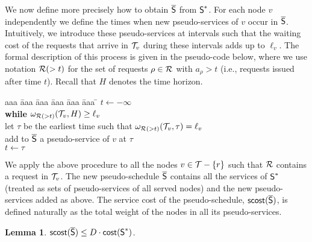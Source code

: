 \documentclass[a4paper]{article}
\newtheorem{lemma}[theorem]{Lemma}
\newcommand{\calR}{{\cal R}}
\newcommand{\calT}{{\cal T}}
\newcommand{\cost}{\mbox{\rm\textsf{cost}}}
\newcommand{\scost}{\mbox{\rm\textsf{scost}}}
\newcommand{\length}{\ell}
\newcommand{\optschedS}{\mbox{\rm\textsf{S}}^\ast}
\newcommand{\pseudoschedS}{\overline{\mbox{\rm\textsf{S}}}}
\begin{document}
We now define more precisely how to obtain $\pseudoschedS$ from $\optschedS$.
For each node $v$ independently we define the times when new
pseudo-services of $v$ occur in $\pseudoschedS$. Intuitively, we introduce
these pseudo-services at intervals such that the waiting cost
of the requests that arrive in $\calT_v$ during these intervals adds
up to $\length_v$.  The formal description of this process is given in
the pseudo-code below, where we use notation $\calR(>t)$ for the set of
requests $\rho\in\calR$ with $a_\rho>t$ (i.e., requests issued after
time $t$). Recall that $H$ denotes the time horizon.

\begin{tabbing}
aaa \= aaa \= aaa \= aaa \= aaa \= aaa \= \kill
\>
$t\gets -\infty$
\\
\> \textbf{while} $\omega_{\calR(>t)}(\calT_v,H)\ge\length_v$
\\
\> \>
let $\tau$ be the earliest time such that
$\omega_{\calR(>t)}(\calT_v,\tau)=\length_v$
\\
\> \>
add to $\pseudoschedS$ a pseudo-service of $v$ at $\tau$ 
\\
\> \>
$t\gets \tau$ 
\end{tabbing}

We apply the above procedure to all the nodes $v\in\calT-\{r\}$
such that $\calR$ contains a request in $\calT_v$. The new
pseudo-schedule $\pseudoschedS$ contains all the services of
$\optschedS$ (treated as sets of pseudo-services of all served nodes)
and the new pseudo-services added as above.  The service cost of the
pseudo-schedule, $\scost(\pseudoschedS)$, is defined naturally as the
total weight of the nodes in all its pseudo-services.


\begin{lemma}\label{lem: bound on pseudo sched}
$\scost(\pseudoschedS) \leq D\cdot\cost(\optschedS)$.
\end{lemma}
\end{document}
